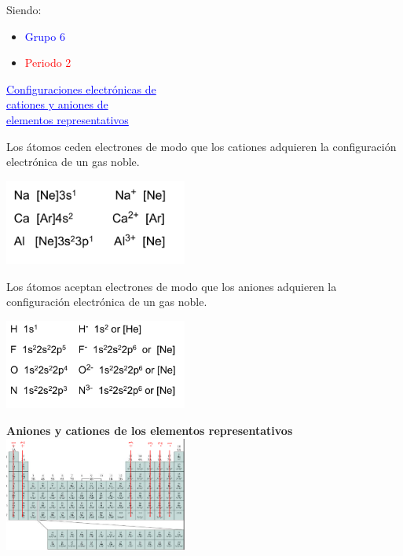         Siendo: 
        \begin{itemize}
            \item \textcolor{blue}{Grupo 6}
            \item \textcolor{red}{Periodo 2}
        \end{itemize}

        \begin{center} \textcolor{blue}{\underline{Configuraciones electrónicas de}} \\ \textcolor{blue}{\underline{cationes y aniones de}} \\ \textcolor{blue}{\underline{elementos representativos}} \end{center}
            \sangria Los átomos ceden electrones de modo que los cationes adquieren la configuración electrónica de un gas noble. 
            \begin{center} \includegraphics[width=6cm]{./imagenes/atomosCedenElectrones.png} \end{center}
            \sangria Los átomos aceptan electrones de modo que los aniones adquieren la configuración electrónica de un gas noble.
            \begin{center} \includegraphics[width=6cm]{./imagenes/atomosAceptanElectrones.png}\end{center}

        \begin{center}
            \textbf{Aniones y cationes de los elementos representativos} \\
            \includegraphics[width=6cm]{./imagenes/anionesYCationesDeElementosRepresentativos.png}
        \end{center}

